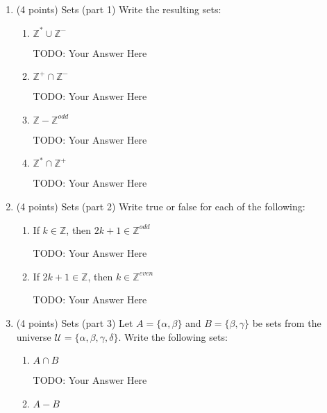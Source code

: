 \documentclass{article}
\begin{document}
\begin{enumerate}
    \item {\large (4 points) Sets (part 1) Write the resulting sets: } 
    \begin{enumerate}
        \item $\mathbb{Z}^* \cup \mathbb{Z}^-  $
             
        {\color{red} TODO: Your Answer Here}
        
        \item $\mathbb{Z}^{+} \cap \mathbb{Z}^{-}  $
             
        {\color{red} TODO: Your Answer Here}
        
        \item $\mathbb{Z} - \mathbb{Z}^{odd}  $
             
        {\color{red} TODO: Your Answer Here}
        
        \item $\mathbb{Z}^* \cap \mathbb{Z}^+  $
             
        {\color{red} TODO: Your Answer Here}
        

    \end{enumerate}
    
    \item{\large (4 points) Sets (part 2) Write true or false for each of the following: } 
    \begin{enumerate}
        \item If $k\in \mathbb{Z}$, then $2k+1\in \mathbb{Z}^{odd}$
             
        {\color{red} TODO: Your Answer Here}
        
        \item If $2k+1\in \mathbb{Z}$, then $k\in \mathbb{Z}^{even}$
             
        {\color{red} TODO: Your Answer Here}
        
    \end{enumerate}
    
    \item{\large (4 points) Sets (part 3) Let $A= \{\alpha,\beta\}$ and $B=\{\beta,\gamma\}$ be sets from the universe $\mathcal{U}=\{\alpha,\beta,\gamma,\delta\}$. Write the following sets: }
    \begin{enumerate}
        \item $A\cap B  $
        
        {\color{red} TODO: Your Answer Here}
        
        \item $A-B $
           

\end{enumerate}
\end{enumerate}
\end{document}
